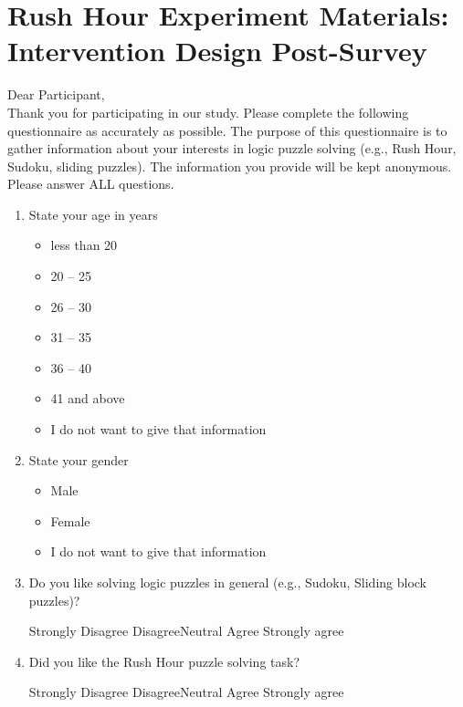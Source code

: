 \chapter{Rush Hour Experiment Materials: Intervention Design Post-Survey}
\label{apx:rushpre}
Dear Participant,\\
Thank you for participating in our study. Please complete the following questionnaire as accurately as possible. The purpose of this questionnaire is to gather information about your interests in logic puzzle solving (e.g., Rush Hour, Sudoku, sliding puzzles). The information you provide will be kept anonymous. \\
Please answer ALL questions.

\begin{enumerate}[topsep=-4em]
\item State your age in years
\begin{itemize}[topsep=-6em, label={o}]
\itemsep-1em 
\item less than 20
\item 20 -- 25
\item 26 -- 30
\item 31 -- 35
\item 36 -- 40
\item 41 and above
\item I do not want to give that information
\end{itemize}
\item State your gender
\begin{itemize}[topsep=-6em, label={o}]
\itemsep-1em 
\item Male
\item Female
\item I do not want to give that information
\end{itemize}
\item Do you like solving logic puzzles in general (e.g., Sudoku, Sliding block puzzles)?
\par Strongly Disagree \hspace{1cm} Disagree\hspace{1cm}Neutral\hspace{1cm} Agree\hspace{1cm} Strongly agree
\item Did you like the Rush Hour puzzle solving task?
\par Strongly Disagree \hspace{1cm} Disagree\hspace{1cm}Neutral\hspace{1cm} Agree\hspace{1cm} Strongly agree

\end{enumerate}
